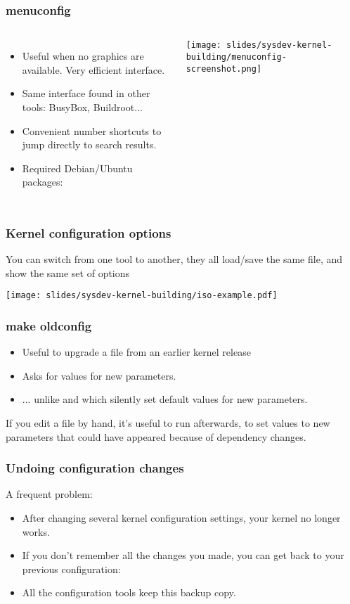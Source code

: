 \begin{frame}
  \frametitle{menuconfig}
  \begin{columns}[T]
    \begin{itemize}
      \item Useful when no graphics are available. Very efficient interface.
      \item Same interface found in other tools: BusyBox, Buildroot...
      \item Convenient number shortcuts to jump directly to search results.
      \item Required Debian/Ubuntu packages: 
    \end{itemize}
    \texttt{[image: slides/sysdev-kernel-building/menuconfig-screenshot.png]}
  \end{columns}
\end{frame}

\begin{frame}
  \frametitle{Kernel configuration options}
  You can switch from one tool to another, they all load/save the same
   file, and show the same set of options
  \begin{center}
    \texttt{[image: slides/sysdev-kernel-building/iso-example.pdf]}
  \end{center}
\end{frame}

\begin{frame}
  \frametitle{make oldconfig}
  \begin{itemize}
  \item Useful to upgrade a  file from an earlier kernel release
  \item Asks for values for new parameters.
  \item ... unlike  and  which silently set
  default values for new parameters.
  \end{itemize}
  If you edit a  file by hand, it's useful
  to run  afterwards, to set values to new
  parameters that could have appeared because of dependency changes.
\end{frame}

\begin{frame}
  \frametitle{Undoing configuration changes}
  A frequent problem:
  \begin{itemize}
  \item After changing several kernel configuration settings, your
    kernel no longer works.
  \item If you don't remember all the changes you made,
    you can get back to your previous configuration:\\
  \item All the configuration tools keep this  backup
    copy.
  \end{itemize}
\end{frame}

